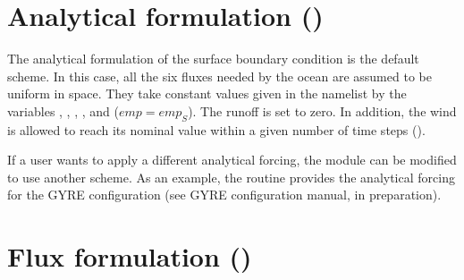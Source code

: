 \documentclass[../tex_main/NEMO_manual]{subfiles}
\begin{document}



\section{Analytical formulation (\protect{})}
\label{sec:SBC_ana}

%

The analytical formulation of the surface boundary condition is the default scheme.
In this case, all the six fluxes needed by the ocean are assumed to 
be uniform in space. They take constant values given in the namelist 
 by the variables , , , 
, and  ($\textit{emp}=\textit{emp}_S$). The runoff is set to zero. 
In addition, the wind is allowed to reach its nominal value within a given number 
of time steps ().

If a user wants to apply a different analytical forcing, the  
module can be modified to use another scheme. As an example, 
the  routine provides the analytical forcing for the 
GYRE configuration (see GYRE configuration manual, in preparation).


\section{Flux formulation (\protect{})}
\label{sec:SBC_flx}

\end{document}
